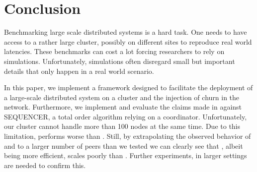 \section{Conclusion}
\label{sec:conclusion}
Benchmarking large scale distributed systems is a hard task. One needs to have access to a rather large cluster, possibly on different sites to reproduce real world latencies. These benchmarks can cost a lot forcing researchers to rely on simulations. Unfortunately, simulations often disregard small but important details that only happen in a real world scenario.

In this paper, we implement \eptotester a framework designed to facilitate the deployment of a large-scale distributed system on a cluster and the injection of churn in the network. Furthermore, we implement \epto and evaluate the claims made in \autocite{matos2015epto} against \jgroups SEQUENCER, a total order algorithm relying on a coordinator. Unfortunately, our cluster cannot handle more than 100 nodes at the same time. Due to this limitation, \epto performs worse than \jgroups.
Still, by extrapolating the observed behavior of \epto and \jgroups to a larger number of peers than we tested we can clearly see that \jgroups, albeit being more efficient, scales poorly than \epto.
Further experiments, in larger settings are needed to confirm this.
